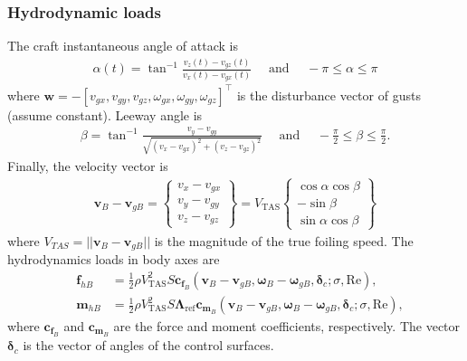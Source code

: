 \documentclass[10pt]{article}
\newcommand{\mbf}[1]{\mathbf{#1}}
\newcommand{\ben}{\begin{eqnarray*}}
\newcommand{\een}{\end{eqnarray*}}
\begin{document}
\subsubsection{Hydrodynamic loads}
% 
The craft instantaneous angle of attack is
\ben
\alpha(t)=\tan^{-1} \frac{v_z(t)-v_{g z}(t)}{v_x(t)-v_{g x}(t)} \quad \text { and } \quad-{\pi} \leq \alpha \leq {\pi}
\een
where $\mbf{w} = -[v_{gx}, v_{gy}, v_{gz}, \omega_{gx}, \omega_{gy}, \omega_{gz}]^{\top}$ is the disturbance vector of gusts (assume constant).
Leeway angle is
\ben
\beta = \tan ^{-1} \frac{v_y-v_{g y}}{\sqrt{\left(v_x-v_{g x}\right)^2+\left(v_z-v_{g z}\right)^2}} \quad \text { and } \quad-\frac{\pi}{2} \leq \beta \leq \frac{\pi}{2}.
\een
% 
Finally, the velocity vector is
\ben
\mbf{v}_B-\mbf{v}_{g B}=\left\{\begin{array}{c}
    v_x-v_{g x} \\
    v_y-v_{g y} \\
    v_z-v_{g z}
\end{array}\right\}=V_{\mathrm{TAS}}\left\{\begin{array}{c}
    \cos \alpha \cos \beta \\
    -\sin \beta            \\
    \sin \alpha \cos \beta
\end{array}\right\}
\een
where $V_{TAS} = ||\mbf{v}_B-\mbf{v}_{g B} ||$ is the magnitude of the true foiling speed.
The hydrodynamics loads in body axes are
\ben
& \mbf{f}_{h B} & =\frac{1}{2} \rho V_{\mathrm{TAS}}^2 S \mathbf{c}_{\mathbf{f}_B}\left(\mathbf{v}_B-\mathbf{v}_{g B}, \boldsymbol{\omega}_B-\boldsymbol{\omega}_{g B}, \boldsymbol{\delta}_c ; \sigma, \mathrm{Re}\right),                                     \\
& \mbf{m}_{h B} & =\frac{1}{2} \rho V_{\mathrm{TAS}}^2 S \boldsymbol{\Lambda}_{\mathrm{ref}} \mathbf{c}_{\mathbf{m}_B}\left(\mathbf{v}_B-\mathbf{v}_{g B}, \boldsymbol{\omega}_B-\boldsymbol{\omega}_{g B}, \boldsymbol{\delta}_c ; \sigma, \mathrm{Re}\right),
\een
where $\mbf{c}_{\mbf{f}_B}$ and $\mbf{c}_{\mbf{m}_B}$ are the force and moment coefficients, respectively.
The vector $\boldsymbol{\delta}_c$ is the vector of angles of the control surfaces.
\end{document}
